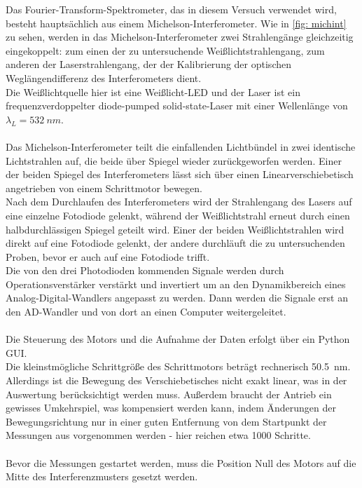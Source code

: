 \documentclass[10pt,a4paper]{article}
\begin{document}
Das Fourier-Transform-Spektrometer, das in diesem Versuch verwendet wird, besteht hauptsächlich aus einem Michelson-Interferometer. Wie in \autoref{fig: michint} zu sehen, werden in das Michelson-Interferometer zwei Strahlengänge gleichzeitig eingekoppelt: zum einen der zu untersuchende Weißlichtstrahlengang, zum anderen der Laserstrahlengang, der der Kalibrierung der optischen Weglängendifferenz des Interferometers dient.\\
Die Weißlichtquelle hier ist eine Weißlicht-LED und der Laser ist ein frequenzverdoppelter diode-pumped solid-state-Laser mit einer Wellenlänge von $\lambda_L=\qty{532}{nm}$.\\\\
Das Michelson-Interferometer teilt die einfallenden Lichtbündel in zwei identische Lichtstrahlen auf, die beide über Spiegel wieder zurückgeworfen werden. Einer der beiden Spiegel des Interferometers lässt sich über einen Linearverschiebetisch angetrieben von einem Schrittmotor bewegen.\\
Nach dem  Durchlaufen des Interferometers wird der Strahlengang des Lasers auf eine einzelne Fotodiode gelenkt, während der Weißlichtstrahl erneut durch einen halbdurchlässigen Spiegel geteilt wird. Einer der beiden Weißlichtstrahlen wird direkt auf eine Fotodiode gelenkt, der andere durchläuft die zu untersuchenden Proben, bevor er auch auf eine Fotodiode trifft.\\
Die von den drei Photodioden kommenden Signale werden durch Operationsverstärker verstärkt und invertiert um an den Dynamikbereich eines Analog-Digital-Wandlers angepasst zu werden. Dann werden die Signale erst an den AD-Wandler und von dort an einen Computer weitergeleitet.\\\\
Die Steuerung des Motors und die Aufnahme der Daten erfolgt über ein Python GUI.\\
Die kleinstmögliche Schrittgröße des Schrittmotors beträgt rechnerisch \qty{50,5}{nm}. Allerdings ist die Bewegung des Verschiebetisches nicht exakt linear, was in der Auswertung berücksichtigt werden muss. Außerdem braucht der Antrieb ein gewisses Umkehrspiel, was kompensiert werden kann, indem Änderungen der Bewegungsrichtung nur in einer guten Entfernung von dem Startpunkt der Messungen aus vorgenommen werden - hier reichen etwa 1000 Schritte.\\\\
Bevor die Messungen gestartet werden, muss die Position Null des Motors auf die Mitte des Interferenzmusters gesetzt werden.
\end{document}
